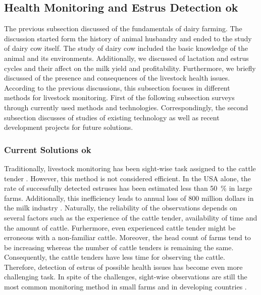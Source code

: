 \documentclass[english,12pt,a4paper,pdftex,elec,utf8]{aaltothesis}
\begin{document}
\subsection{Health Monitoring and Estrus Detection ok} \label{healthmonitoringandestrusdetectionsection}

The previous subsection discussed of the fundamentals of dairy farming. The discussion started form the history of animal husbandry and ended to the study of dairy cow itself. The study of dairy cow included the basic knowledge of the animal and its environments. Additionally, we discussed of lactation and estrus cycles and their affect on the milk yield and profitability. Furthermore, we briefly discussed of the presence and consequences of the livestock health issues. According to the previous discussions, this subsection focuses in different methods for livestock monitoring. First of the following subsection surveys through currently used methods and technologies. Correspondingly, the second subsection discusses of studies of existing technology as well as recent development projects for future solutions.  

\subsubsection{Current Solutions ok} \label{currentsolutionssection}

Traditionally, livestock monitoring has been sight-wise task assigned to the cattle tender \cite{lehmahavaintoja}. However, this method is not considered efficient. In the USA alone, the rate of successfully detected estruses has been estimated less than \SI{50}{\percent} in large farms. Additionally, this inefficiency leads to annual loss of 800 million dollars in the milk industry \cite{BRUNASSI2010}. Naturally, the reliability of the observations depends on several factors such as the experience of the cattle tender, availability of time and the amount of cattle. Furhermore, even experienced cattle tender might be erroneous with a non-familiar cattle. Moreover, the head count of farms tend to be increasing whereas the number of cattle tenders is remaining the same. Consequently, the cattle tenders have less time for observing the cattle. Therefore, detection of estrus of possible health issues has become even more challenging task. In spite of the challenges, sight-wise observations are still the most common monitoring method in small farms and in developing countries \cite{BRUNASSI2010}. 
\end{document}
